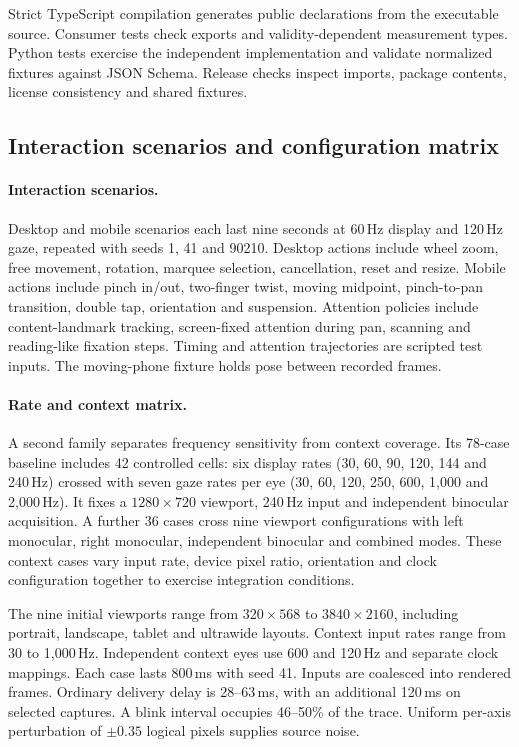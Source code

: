 \documentclass[sigconf,screen,nonacm]{acmart}
\begin{document}
Strict TypeScript compilation generates public declarations from the executable
source. Consumer tests check exports and validity-dependent measurement types.
Python tests exercise the independent implementation and validate normalized
fixtures against JSON Schema. Release checks inspect imports, package contents,
license consistency and shared fixtures.

\subsection{Interaction scenarios and configuration matrix}
\paragraph{Interaction scenarios.}
Desktop and mobile scenarios each last nine seconds at 60\,Hz display and
120\,Hz gaze, repeated with seeds 1, 41 and 90210. Desktop actions include wheel
zoom, free movement, rotation, marquee selection, cancellation, reset and resize. Mobile actions
include pinch in/out, two-finger twist, moving midpoint, pinch-to-pan transition, double tap,
orientation and suspension. Attention policies include content-landmark tracking,
screen-fixed attention during pan, scanning and reading-like fixation steps.
Timing and attention trajectories are scripted test inputs. The moving-phone
fixture holds pose between recorded frames.

\paragraph{Rate and context matrix.}
A second family separates frequency sensitivity from context coverage. Its
78-case baseline includes 42 controlled cells: six display rates (30, 60, 90, 120, 144 and
240\,Hz) crossed with seven gaze rates per eye (30, 60, 120, 250, 600, 1,000 and
2,000\,Hz). It fixes a $1280\times720$ viewport, 240\,Hz input and independent
binocular acquisition. A further 36 cases cross nine viewport configurations
with left monocular, right monocular, independent binocular and combined modes.
These context cases vary input rate, device pixel ratio, orientation and clock
configuration together to exercise integration conditions.

The nine initial viewports range from $320\times568$ to $3840\times2160$, including
portrait, landscape, tablet and ultrawide layouts. Context input rates range
from 30 to 1,000\,Hz. Independent context eyes use 600 and 120\,Hz and separate
clock mappings. Each case lasts 800\,ms with seed 41. Inputs are coalesced into
rendered frames. Ordinary delivery delay is 28--63\,ms, with an additional
120\,ms on selected captures. A blink interval occupies 46--50\% of the trace.
Uniform per-axis perturbation of $\pm0.35$ logical pixels supplies source noise.
\end{document}
